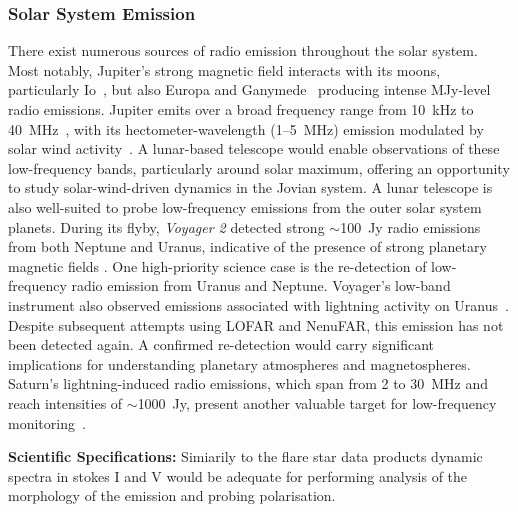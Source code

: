 \subsubsection{Solar System Emission} 
There exist numerous sources of radio emission throughout the solar system. Most notably, Jupiter's strong magnetic field interacts with its moons, particularly Io~\citep{Io}, but also Europa and Ganymede~\citep{Corentin} producing intense MJy-level radio emissions. Jupiter emits over a broad frequency range from 10~kHz to 40~MHz~\citep{zarka_auroral_1998}, with its hectometer-wavelength (1--5~MHz) emission modulated by solar wind activity~\citep{Desch1984}. A lunar-based telescope would enable observations of these low-frequency bands, particularly around solar maximum, offering an opportunity to study solar-wind-driven dynamics in the Jovian system. A lunar telescope is also well-suited to probe low-frequency emissions from the outer solar system planets. During its flyby, \textit{Voyager 2} detected strong $\sim$100~Jy radio emissions from both Neptune and Uranus, indicative of the presence of strong planetary magnetic fields \citep{zarka_auroral_1998, ZHANG199237}. One high-priority science case is the re-detection of low-frequency radio emission from Uranus and Neptune. Voyager's low-band instrument also observed emissions associated with lightning activity on Uranus~\citep{1986Zarka_Emission}. Despite subsequent attempts using LOFAR and NenuFAR, this emission has not been detected again. A confirmed re-detection would carry significant implications for understanding planetary atmospheres and magnetospheres. Saturn's lightning-induced radio emissions, which span from 2 to 30~MHz and reach intensities of $\sim$1000~Jy, present another valuable target for low-frequency monitoring~\citep{Zarka2004}.

\textbf{Scientific Specifications:} Simiarily to the flare star data products dynamic spectra in stokes I and V would be adequate for performing analysis of the morphology of the emission and probing polarisation. 



